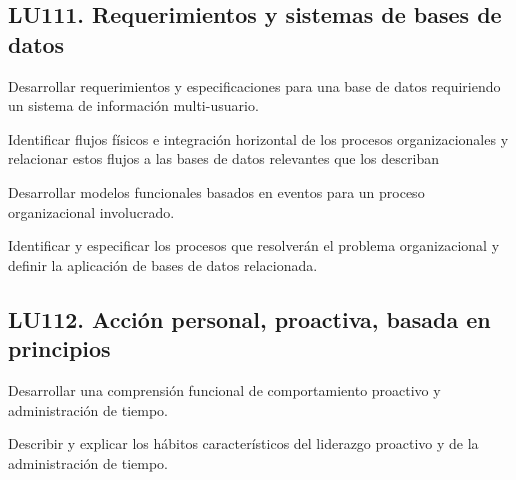 \subsection{LU111. Requerimientos y sistemas de bases de datos}\label{sec:LU111}
\begin{LearningUnit}
\begin{LUGoal}
\item Desarrollar requerimientos y especificaciones para una base de datos requiriendo un sistema de información multi-usuario.
\end{LUGoal}

\begin{LUObjective}
\item Identificar flujos físicos e integración horizontal de los procesos organizacionales y relacionar estos flujos a las bases de datos relevantes que los describan
\item Desarrollar modelos funcionales basados en eventos para un proceso organizacional involucrado.
\item Identificar y especificar los procesos que resolverán el problema organizacional y definir la aplicación de bases de datos relacionada.
\end{LUObjective}
\end{LearningUnit}

\subsection{LU112. Acción personal, proactiva, basada en principios}\label{sec:LU112}
\begin{LearningUnit}
\begin{LUGoal}
\item Desarrollar una comprensión funcional de comportamiento proactivo y administración de tiempo.
\end{LUGoal}

\begin{LUObjective}
\item Describir y explicar los hábitos característicos del liderazgo proactivo y de la administración de tiempo.
\end{LUObjective}
\end{LearningUnit}

